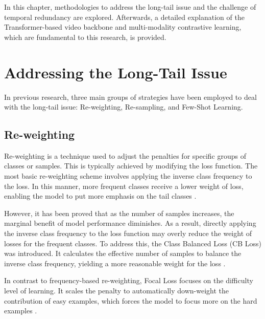 In this chapter, methodologies to address the long-tail issue and the challenge of temporal redundancy are explored. Afterwards, a detailed explanation of the Transformer-based video backbone and multi-modality contrastive learning, which are fundamental to this research, is provided.

\section{Addressing the Long-Tail Issue}
In previous research, three main groups of strategies have been employed to deal with the long-tail issue: Re-weighting, Re-sampling, and Few-Shot Learning.

\subsection{Re-weighting}
Re-weighting is a technique used to adjust the penalties for specific groups of classes or samples. This is typically achieved by modifying the loss function. The most basic re-weighting scheme involves applying the inverse class frequency to the loss. In this manner, more frequent classes receive a lower weight of loss, enabling the model to put more emphasis on the tail classes \parencite{khan2017cost, mostajabi2015feedforward}.

However, it has been proved that as the number of samples increases, the marginal benefit of model performance diminishes. As a result, directly applying the inverse class frequency to the loss function may overly reduce the weight of losses for the frequent classes. To address this, the Class Balanced Loss (CB Loss) was introduced. It calculates the effective number of samples to balance the inverse class frequency, yielding a more reasonable weight for the loss \parencite{cui2019class}.


In contrast to frequency-based re-weighting, Focal Loss focuses on the difficulty level of learning. It scales the penalty to automatically down-weight the contribution of easy examples, which forces the model to focus more on the hard examples \parencite{lin2017focal}.

